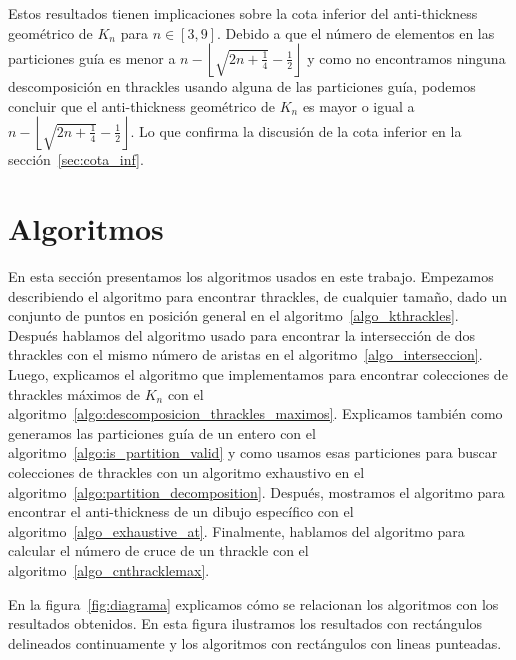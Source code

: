     Estos resultados tienen implicaciones sobre la cota inferior del anti-thickness geométrico de
    $K_n$  para $n \in [3,9]$. Debido a que el número de elementos en las particiones guía es menor
    a  $n - \left\lfloor\sqrt{2n+\frac{1}{4}} - \frac{1}{2}\right\rfloor$ y como no encontramos
    ninguna  descomposición en thrackles usando alguna de las particiones guía, podemos concluir
    que el anti-thickness  geométrico de $K_n$ es mayor o igual a $n -
    \left\lfloor\sqrt{2n+\frac{1}{4}} -  \frac{1}{2}\right\rfloor$. Lo que confirma la discusión de
    la cota inferior en la sección~\ref{sec:cota_inf}.


\section{Algoritmos}\label{seccion_algoritmos}
  En esta sección presentamos los algoritmos usados en este trabajo. Empezamos
  describiendo el algoritmo para encontrar thrackles, de cualquier tamaño, dado
  un conjunto de puntos en posición general en el algoritmo~\ref{algo_kthrackles}. Después hablamos del algoritmo usado para encontrar la intersección de dos thrackles con el mismo número de
  aristas en el algoritmo~\ref{algo_interseccion}. Luego, explicamos el algoritmo que implementamos
  para encontrar colecciones de thrackles máximos de $K_n$ con el
  algoritmo~\ref{algo:descomposicion_thrackles_maximos}. Explicamos también como generamos las
  particiones guía de un entero con el algoritmo~\ref{algo:is_partition_valid} y como  usamos esas
  particiones para buscar colecciones de thrackles con un algoritmo exhaustivo en el
  algoritmo~\ref{algo:partition_decomposition}.
  Después, mostramos el algoritmo para encontrar el anti-thickness de un dibujo específico con el
  algoritmo~\ref{algo_exhaustive_at}. Finalmente, hablamos del algoritmo para calcular el número de
  cruce de un thrackle con el algoritmo~\ref{algo_cnthracklemax}.

  En la figura~\ref{fig:diagrama} explicamos cómo se relacionan los algoritmos con los resultados
  obtenidos. En esta figura ilustramos los resultados con rectángulos delineados continuamente y los
  algoritmos con rectángulos con lineas punteadas.

